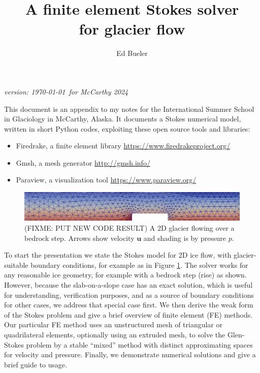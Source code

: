 \documentclass[letterpaper,final,12pt,reqno]{amsart}
\newcommand{\bu}{\mathbf{u}}
\begin{document}
\graphicspath{{figures/}}

\title[FE Stokes solver for glacier flow]{A finite element Stokes solver \\ for glacier flow}

\author{Ed Bueler}

\maketitle

\vspace{-8mm}
\begin{center}
\footnotesize
\emph{version: \today~for McCarthy 2024}
\end{center}

\thispagestyle{empty}
\bigskip


This document is an appendix to my notes for the International Summer School in Glaciology in McCarthy, Alaska.  It documents a Stokes numerical model, written in short Python codes, exploiting these open source tools and libraries:
\begin{itemize}
\item Firedrake, a finite element library \hfill \url{https://www.firedrakeproject.org/}
\item Gmsh, a mesh generator \hfill \url{http://gmsh.info/}
\item Paraview, a visualization tool \hfill \url{https://www.paraview.org/}
\end{itemize}

\begin{figure}[h]
\includegraphics[width=\textwidth,angle=-5.7296]{stepflowlin}  %
\caption{(FIXME: PUT NEW CODE RESULT)  A 2D glacier flowing over a bedrock step.  Arrows show velocity $\bu$ and shading is by pressure $p$.}
\label{fig:glacier:bedstep}
\end{figure}

To start the presentation we state the Stokes model for 2D ice flow, with glacier-suitable boundary conditions, for example as in Figure \ref{fig:glacier:bedstep}.  The solver works for any reasonable ice geometry, for example with a bedrock step (rise) as shown.  However, because the slab-on-a-slope case has an exact solution, which is useful for understanding, verification purposes, and as a source of boundary conditions for other cases, we address that special case first.  We then derive the weak form of the Stokes problem and give a brief overview of finite element (FE) methods.  Our particular FE method uses an unstructured mesh of triangular or quadrilateral elements, optionally using an extruded mesh, to solve the Glen-Stokes problem by a stable ``mixed'' method with distinct approximating spaces for velocity and pressure.  Finally, we demonstrate numerical solutions and give a brief guide to usage.
\end{document}
